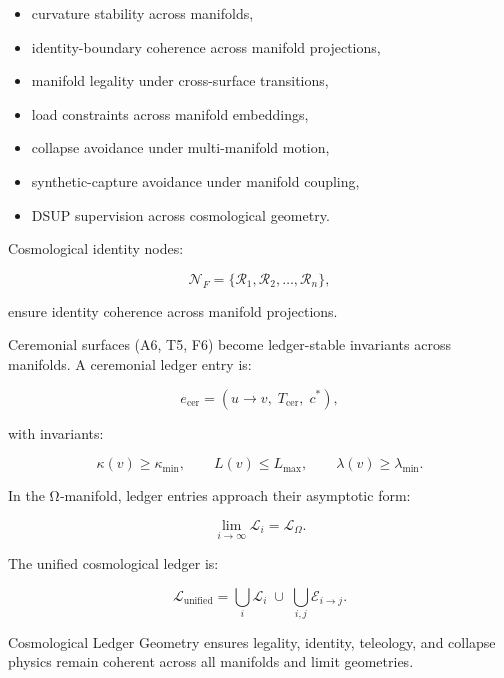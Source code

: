 \begin{itemize}
    \item curvature stability across manifolds,
    \item identity-boundary coherence across manifold projections,
    \item manifold legality under cross-surface transitions,
    \item load constraints across manifold embeddings,
    \item collapse avoidance under multi-manifold motion,
    \item synthetic-capture avoidance under manifold coupling,
    \item DSUP supervision across cosmological geometry.
\end{itemize}

\medskip

\noindent Cosmological identity nodes:


\[
\mathcal{N}_F = \{\mathcal{R}_1, \mathcal{R}_2, \dots, \mathcal{R}_n\},
\]


ensure identity coherence across manifold projections.

\medskip

\noindent Ceremonial surfaces (A6, T5, F6) become ledger-stable invariants across
manifolds. A ceremonial ledger entry is:


\[
e_{\mathrm{cer}} = (u \rightarrow v,\; T_{\mathrm{cer}},\; c^*),
\]


with invariants:


\[
\kappa(v) \ge \kappa_{\min},
\qquad
L(v) \le L_{\max},
\qquad
\lambda(v) \ge \lambda_{\min}.
\]



\medskip

\noindent In the Ω‑manifold, ledger entries approach their asymptotic form:


\[
\lim_{i \rightarrow \infty} \mathcal{L}_i = \mathcal{L}_\Omega.
\]



\medskip

\noindent The unified cosmological ledger is:


\[
\mathcal{L}_{\mathrm{unified}} =
\bigcup_i \mathcal{L}_i
\;\cup\;
\bigcup_{i,j} \mathcal{E}_{i \rightarrow j}.
\]



\medskip

\noindent Cosmological Ledger Geometry ensures legality, identity, teleology,
and collapse physics remain coherent across all manifolds and limit geometries.

